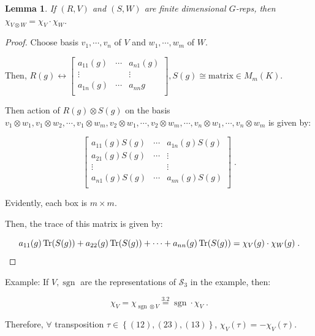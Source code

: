 \documentclass{article}
\theoremstyle{definition}
\theoremstyle{plain}
\newtheorem{lemma}[theorem]{Lemma}
\theoremstyle{remark}
\begin{document}
    \begin{lemma}
        If \((R,V)\) and \((S,W)\) are finite dimensional \(G\)-reps, then \(\chi_{V \otimes W} = \chi_V \cdot \chi_W\).
    \end{lemma}

    \begin{proof}
        Choose basis \(v_1 , \cdots , v_n\) of \(V\) and \(w_1 , \cdots ,w_m\) of \(W\).
        
        Then, \(R(g) \leftrightarrow \begin{bmatrix}
            a_{11} (g) & \cdots & a_{n1} (g) \\
            \vdots &  & \vdots \\
            a_{1n} (g) & \cdots  & a_{nn} g \\
        \end{bmatrix}, S(g) \cong \text{matrix} \in M_m(K)\).

        Then action of \(R(g) \otimes S(g)\) on the basis \(v_1 \otimes w_1 , v_1 \otimes w_2 , \cdots , v_1 \otimes w_m , v_2 \otimes w_1, \cdots , v_2 \otimes w_m, \cdots , v_n \otimes w_1, \cdots , v_n \otimes w_m\) is given by:

        \[
            \begin{bmatrix}
                \boxed{a_{11}(g) S(g)} & \cdots & \boxed{a_{1n}(g) S(g)} \\
                \boxed{a_{21}(g) S(g)} & \cdots & \vdots \\
                \vdots &  & \vdots \\
                \boxed{a_{n1}(g) S(g)} & \cdots & \boxed{a_{nn}(g) S(g)} \\
            \end{bmatrix} \;.
        \]

        Evidently, each box is \(m \times m\).

        Then, the trace of this matrix is given by:

        \[
            a_{11} (g) \Tr(S(g)) + a_{22}(g) \Tr(S(g)) + \cdots + a_{nn}(g) \Tr (S(g)) = \chi_V(g) \cdot \chi_W(g)\;.
        \]
    \end{proof}

    Example: If \(V, \operatorname{sgn}\) are the representations of \(\mathscr{S}_3\) in the example, then:

    \[
        \chi_V = \chi_{\operatorname{sgn} \otimes V} \overset{3.2}{=} \operatorname{sgn} \cdot \chi_V\;.
    \]

    Therefore, \(\forall\) transposition \(\tau\in \left\{ (12),(23),(13)\right\}\), \(\chi_V(\tau) = - \chi_V(\tau)\).
    
\end{document}
